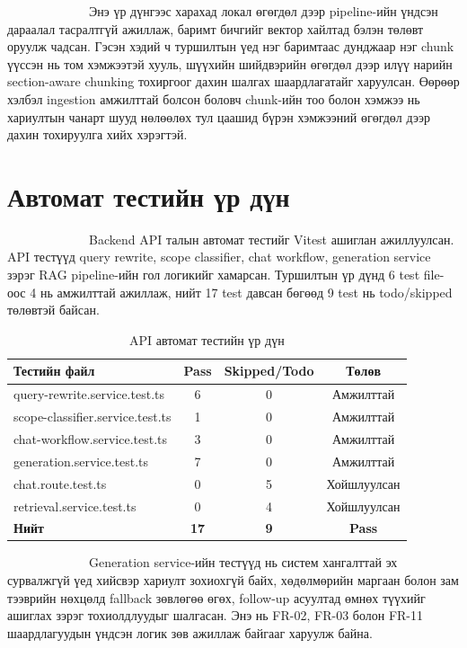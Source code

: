 \documentclass[12pt,A4]{report}
\begin{document}
\ \ \ \ \ \ \ \ \  \ \ \ \ Энэ үр дүнгээс харахад локал өгөгдөл дээр
pipeline-ийн үндсэн дараалал тасралтгүй ажиллаж, баримт бичгийг
вектор хайлтад бэлэн төлөвт оруулж чадсан. Гэсэн хэдий ч туршилтын
үед нэг баримтаас дунджаар нэг chunk үүссэн нь том хэмжээтэй хууль,
шүүхийн шийдвэрийн өгөгдөл дээр илүү нарийн section-aware chunking
тохиргоог дахин шалгах шаардлагатайг харуулсан. Өөрөөр хэлбэл ingestion
амжилттай болсон боловч chunk-ийн тоо болон хэмжээ нь хариултын чанарт
шууд нөлөөлөх тул цаашид бүрэн хэмжээний өгөгдөл дээр дахин тохируулга
хийх хэрэгтэй.

\section{Автомат тестийн үр дүн}

\ \ \ \ \ \ \ \ \  \ \ \ \ Backend API талын автомат тестийг Vitest
ашиглан ажиллуулсан. API тестүүд query rewrite, scope classifier,
chat workflow, generation service зэрэг RAG pipeline-ийн гол логикийг
хамарсан. Туршилтын үр дүнд 6 test file-оос 4 нь амжилттай ажиллаж,
нийт 17 test давсан бөгөөд 9 test нь todo/skipped төлөвтэй байсан.

\begin{table}[H]
\renewcommand{\tablename}{Хүснэгт}
\centering
\caption{API автомат тестийн үр дүн}
\begin{tabular}{|l|c|c|c|}
\hline
\textbf{Тестийн файл} & \textbf{Pass} & \textbf{Skipped/Todo} & \textbf{Төлөв} \\
\hline
query-rewrite.service.test.ts & 6 & 0 & Амжилттай \\
scope-classifier.service.test.ts & 1 & 0 & Амжилттай \\
chat-workflow.service.test.ts & 3 & 0 & Амжилттай \\
generation.service.test.ts & 7 & 0 & Амжилттай \\
chat.route.test.ts & 0 & 5 & Хойшлуулсан \\
retrieval.service.test.ts & 0 & 4 & Хойшлуулсан \\
\hline
\textbf{Нийт} & \textbf{17} & \textbf{9} & \textbf{Pass} \\
\hline
\end{tabular}
\label{tab:api_test_result}
\end{table}

\ \ \ \ \ \ \ \ \  \ \ \ \ Generation service-ийн тестүүд нь систем
хангалттай эх сурвалжгүй үед хийсвэр хариулт зохиохгүй байх, хөдөлмөрийн
маргаан болон зам тээврийн нөхцөлд fallback зөвлөгөө өгөх, follow-up
асуултад өмнөх түүхийг ашиглах зэрэг тохиолдлуудыг шалгасан. Энэ нь
FR-02, FR-03 болон FR-11 шаардлагуудын үндсэн логик зөв ажиллаж байгааг
харуулж байна.
\end{document}
